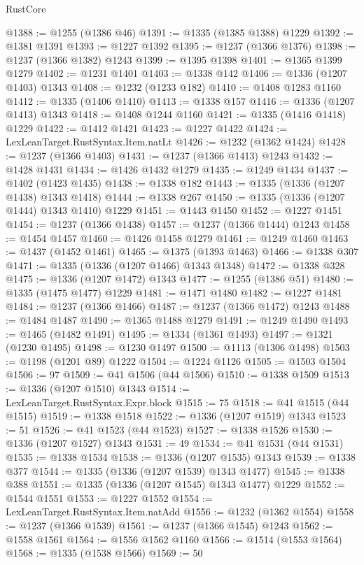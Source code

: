 \begin{lexlean}{RustCore}
\begin{coremodule}
@1388 := @1255 (@1386 @46)
@1391 := @1335 (@1385 @1388) @1229
@1392 := @1381 @1391
@1393 := @1227 @1392
@1395 := @1237 (@1366 @1376)
@1398 := @1237 (@1366 @1382) @1243
@1399 := @1395 @1398
@1401 := @1365 @1399 @1279
@1402 := @1231 @1401
@1403 := @1338 @142
@1406 := @1336 (@1207 @1403) @1343
@1408 := @1232 (@1233 @182)
@1410 := @1408 @1283 @1160
@1412 := @1335 (@1406 @1410)
@1413 := @1338 @157
@1416 := @1336 (@1207 @1413) @1343
@1418 := @1408 @1244 @1160
@1421 := @1335 (@1416 @1418) @1229
@1422 := @1412 @1421
@1423 := @1227 @1422
@1424 := LexLeanTarget.RustSyntax.Item.natLt
@1426 := @1232 (@1362 @1424)
@1428 := @1237 (@1366 @1403)
@1431 := @1237 (@1366 @1413) @1243
@1432 := @1428 @1431
@1434 := @1426 @1432 @1279
@1435 := @1249 @1434
@1437 := @1402 (@1423 @1435)
@1438 := @1338 @182
@1443 := @1335 (@1336 (@1207 @1438) @1343 @1418)
@1444 := @1338 @267
@1450 := @1335 (@1336 (@1207 @1444) @1343 @1410) @1229
@1451 := @1443 @1450
@1452 := @1227 @1451
@1454 := @1237 (@1366 @1438)
@1457 := @1237 (@1366 @1444) @1243
@1458 := @1454 @1457
@1460 := @1426 @1458 @1279
@1461 := @1249 @1460
@1463 := @1437 (@1452 @1461)
@1465 := @1375 (@1393 @1463)
@1466 := @1338 @307
@1471 := @1335 (@1336 (@1207 @1466) @1343 @1348)
@1472 := @1338 @328
@1475 := @1336 (@1207 @1472) @1343
@1477 := @1255 (@1386 @51)
@1480 := @1335 (@1475 @1477) @1229
@1481 := @1471 @1480
@1482 := @1227 @1481
@1484 := @1237 (@1366 @1466)
@1487 := @1237 (@1366 @1472) @1243
@1488 := @1484 @1487
@1490 := @1365 @1488 @1279
@1491 := @1249 @1490
@1493 := @1465 (@1482 @1491)
@1495 := @1334 (@1361 @1493)
@1497 := @1321 (@1230 @1495)
@1498 := @1230 @1497
@1500 := @1113 (@1306 @1498)
@1503 := @1198 (@1201 @89) @1222
@1504 := @1224 @1126
@1505 := @1503 @1504
@1506 := 97
@1509 := @41 @1506 (@44 @1506)
@1510 := @1338 @1509
@1513 := @1336 (@1207 @1510) @1343
@1514 := LexLeanTarget.RustSyntax.Expr.block
@1515 := 75
@1518 := @41 @1515 (@44 @1515)
@1519 := @1338 @1518
@1522 := @1336 (@1207 @1519) @1343
@1523 := 51
@1526 := @41 @1523 (@44 @1523)
@1527 := @1338 @1526
@1530 := @1336 (@1207 @1527) @1343
@1531 := 49
@1534 := @41 @1531 (@44 @1531)
@1535 := @1338 @1534
@1538 := @1336 (@1207 @1535) @1343
@1539 := @1338 @377
@1544 := @1335 (@1336 (@1207 @1539) @1343 @1477)
@1545 := @1338 @388
@1551 := @1335 (@1336 (@1207 @1545) @1343 @1477) @1229
@1552 := @1544 @1551
@1553 := @1227 @1552
@1554 := LexLeanTarget.RustSyntax.Item.natAdd
@1556 := @1232 (@1362 @1554)
@1558 := @1237 (@1366 @1539)
@1561 := @1237 (@1366 @1545) @1243
@1562 := @1558 @1561
@1564 := @1556 @1562 @1160
@1566 := @1514 (@1553 @1564)
@1568 := @1335 (@1538 @1566)
@1569 := 50

\end{coremodule}
\end{lexlean}
